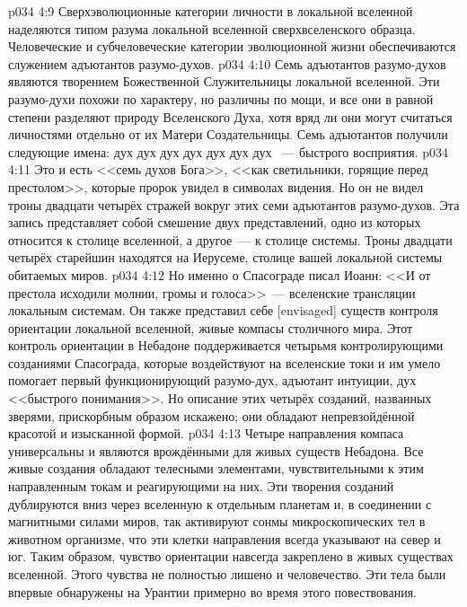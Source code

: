 \vs p034 4:9 Сверхэволюционные категории личности в локальной вселенной наделяются типом разума локальной вселенной сверхвселенского образца. Человеческие и субчеловеческие категории эволюционной жизни обеспечиваются служением адъютантов разумо\hyp{}духов.
\vs p034 4:10 \pc Семь адъютантов разумо\hyp{}духов являются творением Божественной Служительницы локальной вселенной. Эти разумо\hyp{}духи похожи по характеру, но различны по мощи, и все они в равной степени разделяют природу Вселенского Духа, хотя вряд ли  они могут считаться личностями отдельно от их Матери Создательницы. Семь адъютантов получили следующие имена: дух  дух  дух  дух  дух  дух  дух ~--- быстрого восприятия.
\vs p034 4:11 \pc Это и есть <<семь духов Бога>>, <<как светильники, горящие перед престолом>>, которые пророк увидел в символах видения. Но он не видел троны двадцати четырёх стражей вокруг этих семи адъютантов разумо\hyp{}духов. Эта запись представляет собой смешение двух представлений, одно из которых относится к столице вселенной, а другое~--- к столице системы. Троны двадцати четырёх старейшин находятся на Иерусеме, столице вашей локальной системы обитаемых миров.
\vs p034 4:12 Но именно о Спасограде писал Иоанн: <<И от престола исходили молнии, громы и голоса>>~--- вселенские трансляции локальным системам. Он также представил себе [envisaged] существ контроля ориентации локальной вселенной, живые компасы столичного мира. Этот контроль ориентации в Небадоне поддерживается четырьмя контролирующими созданиями Спасограда, которые воздействуют на вселенские токи и им умело помогает первый функционирующий разумо\hyp{}дух, адъютант интуиции, дух <<быстрого понимания>>. Но описание этих четырёх созданий, названных зверями, прискорбным образом искажено; они обладают непревзойдённой красотой и изысканной формой.
\vs p034 4:13 Четыре направления компаса универсальны и являются врождёнными для живых существ Небадона. Все живые создания обладают телесными элементами, чувствительными к этим направленным токам и реагирующими на них. Эти творения созданий дублируются вниз через вселенную к отдельным планетам и, в соединении с магнитными силами миров, так активируют сонмы микроскопических тел в животном организме, что эти клетки направления всегда указывают на север и юг. Таким образом, чувство ориентации навсегда закреплено в живых существах вселенной. Этого чувства не полностью лишено и человечество. Эти тела были впервые обнаружены на Урантии примерно во время этого повествования.
